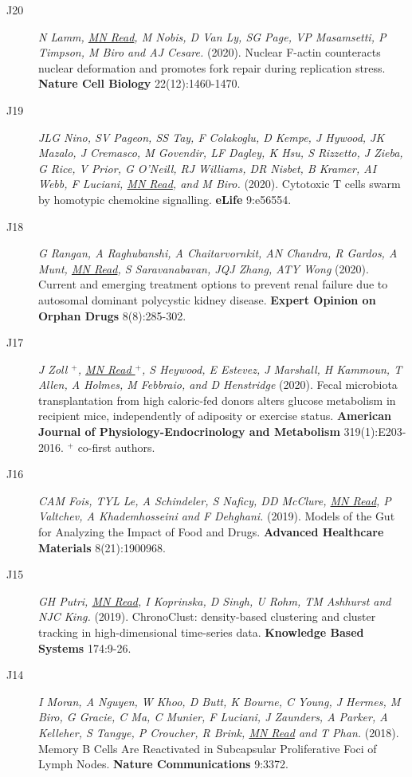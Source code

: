 \documentclass[a4paper]{article}
\begin{document}
\begin{description}
\item[J20]
\textit{N Lamm, \underline{MN Read}, M Nobis, D Van Ly, SG Page, VP Masamsetti, P Timpson, M Biro and AJ Cesare.}
(2020).
Nuclear F-actin counteracts nuclear deformation and promotes fork repair during replication stress.
\textbf{Nature Cell Biology} 22(12):1460-1470. %

\item[J19]
\textit{JLG Nino, SV Pageon, SS Tay, F Colakoglu, D Kempe, J Hywood, JK Mazalo, J Cremasco, M Govendir, LF Dagley, K Hsu, S Rizzetto, J Zieba, G Rice, V Prior, G O’Neill, RJ Williams, DR Nisbet, B Kramer, AI Webb, F Luciani, \underline{MN Read}, and M Biro.}
(2020).
Cytotoxic T cells swarm by homotypic chemokine signalling.
\textbf{eLife} 9:e56554.

\item[J18]
\textit{G Rangan, A Raghubanshi, A Chaitarvornkit, AN Chandra, R Gardos, A Munt, \underline{MN Read}, S Saravanabavan, JQJ Zhang, ATY Wong}
(2020).
Current and emerging treatment options to prevent renal failure due to autosomal dominant polycystic kidney disease.
\textbf{Expert Opinion on Orphan Drugs} 8(8):285-302.

\item[J17]
\textit{J Zoll $^{+}$, \underline{MN Read $^{+}$}, S Heywood, E Estevez, J Marshall, H Kammoun, T Allen, A Holmes, M Febbraio, and D Henstridge}
(2020).
Fecal microbiota transplantation from high caloric-fed donors alters glucose metabolism in recipient mice, independently of adiposity or exercise status.
\textbf{American Journal of Physiology-Endocrinology and Metabolism} 319(1):E203-2016.
$^{+}$ co-first authors.

\item[J16]
\textit{CAM Fois, TYL Le, A Schindeler, S Naficy, DD McClure, \underline{MN Read}, P Valtchev, A Khademhosseini and F Dehghani.}
(2019).
Models of the Gut for Analyzing the Impact of Food and Drugs.
\textbf{Advanced Healthcare Materials} 8(21):1900968.

\item[J15]
\textit{GH Putri, \underline{MN Read}, I Koprinska, D Singh, U Rohm, TM Ashhurst and NJC King.}
(2019).
ChronoClust: density-based clustering and cluster tracking in high-dimensional time-series data.
\textbf{Knowledge Based Systems} 174:9-26.

\item[J14]
\textit{I Moran, A Nguyen, W Khoo, D Butt, K Bourne, C Young, J Hermes, M Biro, G Gracie, C Ma, C Munier, F Luciani, J Zaunders, A Parker, A Kelleher, S Tangye, P Croucher, R Brink, \underline{MN Read} and T Phan.}
(2018).
Memory B Cells Are Reactivated in Subcapsular Proliferative Foci of Lymph Nodes.
\textbf{Nature Communications} 9:3372.


\end{description}
\end{document}
